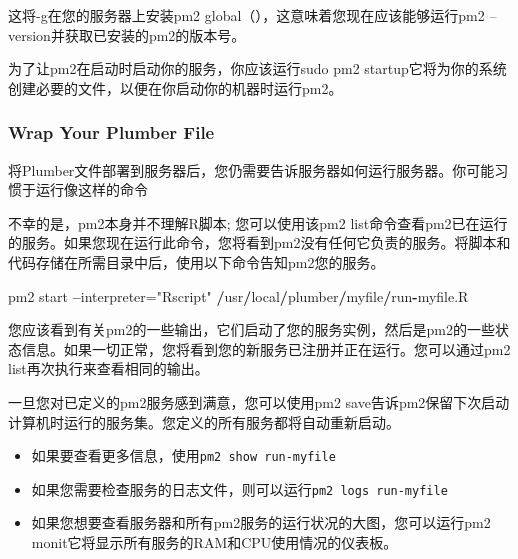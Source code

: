 \documentclass[]{book}
\newenvironment{Shaded}{\begin{snugshade}}{\end{snugshade}}
\newcommand{\KeywordTok}[1]{\textcolor[rgb]{0.13,0.29,0.53}{\textbf{#1}}}
\newcommand{\DataTypeTok}[1]{\textcolor[rgb]{0.13,0.29,0.53}{#1}}
\newcommand{\DecValTok}[1]{\textcolor[rgb]{0.00,0.00,0.81}{#1}}
\newcommand{\StringTok}[1]{\textcolor[rgb]{0.31,0.60,0.02}{#1}}
\newcommand{\OperatorTok}[1]{\textcolor[rgb]{0.81,0.36,0.00}{\textbf{#1}}}
\newcommand{\NormalTok}[1]{#1}
\providecommand{\tightlist}{%
  \setlength{\itemsep}{0pt}\setlength{\parskip}{0pt}}
\begin{document}
这将-g在您的服务器上安装pm2 global（），这意味着您现在应该能够运行pm2
--version并获取已安装的pm2的版本号。

为了让pm2在启动时启动你的服务，你应该运行sudo pm2
startup它将为你的系统创建必要的文件，以便在你启动你的机器时运行pm2。

\subsubsection{Wrap Your Plumber File}\label{wrap-your-plumber-file}

将Plumber文件部署到服务器后，您仍需要告诉服务器如何运行服务器。你可能习惯于运行像这样的命令

\begin{Shaded}
\end{Shaded}

不幸的是，pm2本身并不理解R脚本; 您可以使用该pm2
list命令查看pm2已在运行的服务。如果您现在运行此命令，您将看到pm2没有任何它负责的服务。将脚本和代码存储在所需目录中后，使用以下命令告知pm2您的服务。

\begin{Shaded}
\begin{Highlighting}[]
\NormalTok{pm2 start }\OperatorTok{--}\NormalTok{interpreter=}\StringTok{"Rscript"} \OperatorTok{/}\NormalTok{usr}\OperatorTok{/}\NormalTok{local}\OperatorTok{/}\NormalTok{plumber}\OperatorTok{/}\NormalTok{myfile}\OperatorTok{/}\NormalTok{run}\OperatorTok{-}\NormalTok{myfile.R}
\end{Highlighting}
\end{Shaded}

您应该看到有关pm2的一些输出，它们启动了您的服务实例，然后是pm2的一些状态信息。如果一切正常，您将看到您的新服务已注册并正在运行。您可以通过pm2
list再次执行来查看相同的输出。

一旦您对已定义的pm2服务感到满意，您可以使用pm2
save告诉pm2保留下次启动计算机时运行的服务集。您定义的所有服务都将自动重新启动。

\begin{itemize}
\tightlist
\item
  如果要查看更多信息，使用\texttt{pm2\ show\ run-myfile}
\item
  如果您需要检查服务的日志文件，则可以运行\texttt{pm2\ logs\ run-myfile}
\item
  如果您想要查看服务器和所有pm2服务的运行状况的大图，您可以运行pm2
  monit它将显示所有服务的RAM和CPU使用情况的仪表板。
\end{itemize}
\end{document}
